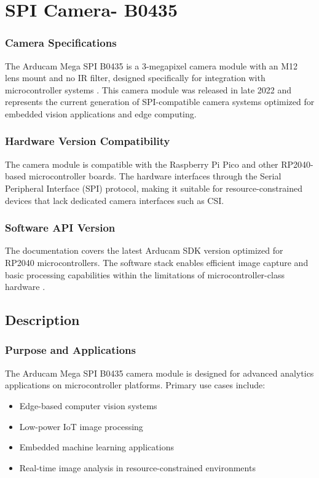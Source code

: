 %
%

\chapter{SPI Camera- B0435}

\subsection{Camera Specifications}
The Arducam Mega SPI B0435 is a 3-megapixel camera module with an M12 lens mount and no IR filter, designed specifically for integration with microcontroller systems \cite{Arducam:2023}. This camera module was released in late 2022 and represents the current generation of SPI-compatible camera systems optimized for embedded vision applications and edge computing.

\subsection{Hardware Version Compatibility}
The camera module is compatible with the Raspberry Pi Pico and other RP2040-based microcontroller boards. The hardware interfaces through the Serial Peripheral Interface (SPI) protocol, making it suitable for resource-constrained devices that lack dedicated camera interfaces such as CSI.

\subsection{Software API Version}
The documentation covers the latest Arducam SDK version optimized for RP2040 microcontrollers. The software stack enables efficient image capture and basic processing capabilities within the limitations of microcontroller-class hardware \cite{Arducam:2023}.

\section{Description}
\subsection{Purpose and Applications}
The Arducam Mega SPI B0435 camera module is designed for advanced analytics applications on microcontroller platforms. Primary use cases include:
\begin{itemize}
	\item Edge-based computer vision systems
	\item Low-power IoT image processing
	\item Embedded machine learning applications
	\item Real-time image analysis in resource-constrained environments
\end{itemize}

